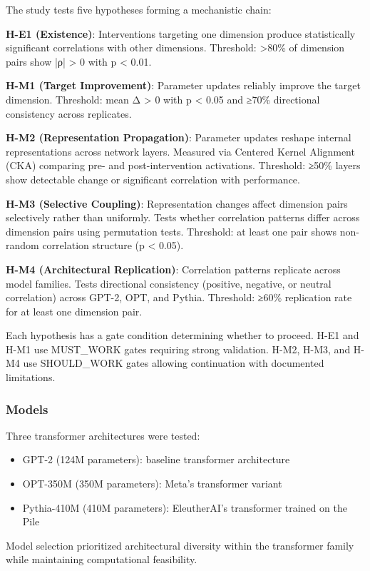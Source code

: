 The study tests five hypotheses forming a mechanistic chain:

\textbf{H-E1 (Existence)}: Interventions targeting one dimension produce statistically significant correlations with other dimensions. Threshold: >80\% of dimension pairs show |ρ| > 0 with p < 0.01.

\textbf{H-M1 (Target Improvement)}: Parameter updates reliably improve the target dimension. Threshold: mean Δ > 0 with p < 0.05 and ≥70\% directional consistency across replicates.

\textbf{H-M2 (Representation Propagation)}: Parameter updates reshape internal representations across network layers. Measured via Centered Kernel Alignment (CKA) comparing pre- and post-intervention activations. Threshold: ≥50\% layers show detectable change or significant correlation with performance.

\textbf{H-M3 (Selective Coupling)}: Representation changes affect dimension pairs selectively rather than uniformly. Tests whether correlation patterns differ across dimension pairs using permutation tests. Threshold: at least one pair shows non-random correlation structure (p < 0.05).

\textbf{H-M4 (Architectural Replication)}: Correlation patterns replicate across model families. Tests directional consistency (positive, negative, or neutral correlation) across GPT-2, OPT, and Pythia. Threshold: ≥60\% replication rate for at least one dimension pair.

Each hypothesis has a gate condition determining whether to proceed. H-E1 and H-M1 use MUST_WORK gates requiring strong validation. H-M2, H-M3, and H-M4 use SHOULD_WORK gates allowing continuation with documented limitations.

\subsubsection{Models}

Three transformer architectures were tested:
\begin{itemize}
\item GPT-2 (124M parameters): baseline transformer architecture
\item OPT-350M (350M parameters): Meta's transformer variant
\item Pythia-410M (410M parameters): EleutherAI's transformer trained on the Pile
\end{itemize}

Model selection prioritized architectural diversity within the transformer family while maintaining computational feasibility.
